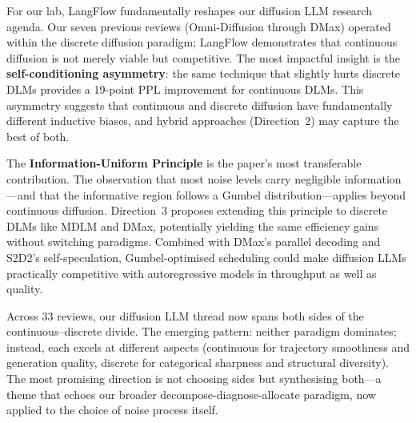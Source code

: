 \documentclass[11pt]{article}
\begin{document}
For our lab, LangFlow fundamentally reshapes our diffusion LLM research agenda. Our seven previous reviews (Omni-Diffusion through DMax) operated within the discrete diffusion paradigm; LangFlow demonstrates that continuous diffusion is not merely viable but competitive. The most impactful insight is the \textbf{self-conditioning asymmetry}: the same technique that slightly hurts discrete DLMs provides a 19-point PPL improvement for continuous DLMs. This asymmetry suggests that continuous and discrete diffusion have fundamentally different inductive biases, and hybrid approaches (Direction~2) may capture the best of both.

The \textbf{Information-Uniform Principle} is the paper's most transferable contribution. The observation that most noise levels carry negligible information---and that the informative region follows a Gumbel distribution---applies beyond continuous diffusion. Direction~3 proposes extending this principle to discrete DLMs like MDLM and DMax, potentially yielding the same efficiency gains without switching paradigms. Combined with DMax's parallel decoding and S2D2's self-speculation, Gumbel-optimised scheduling could make diffusion LLMs practically competitive with autoregressive models in throughput as well as quality.

Across 33 reviews, our diffusion LLM thread now spans both sides of the continuous--discrete divide. The emerging pattern: neither paradigm dominates; instead, each excels at different aspects (continuous for trajectory smoothness and generation quality, discrete for categorical sharpness and structural diversity). The most promising direction is not choosing sides but synthesising both---a theme that echoes our broader decompose-diagnose-allocate paradigm, now applied to the choice of noise process itself.
\end{document}
